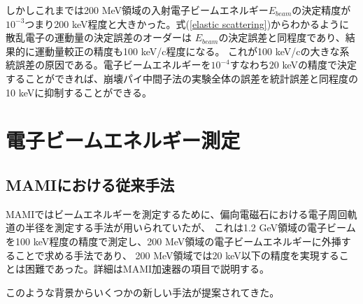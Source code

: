 \documentclass[a4paper,11pt,uplatex]{jsbook}
\begin{document}
しかしこれまでは200 MeV領域の入射電子ビームエネルギー$E_{beam}$の決定精度が$10^{-3}$つまり200 keV程度と大きかった。式(\ref{elastic scattering})からわかるように散乱電子の運動量の決定誤差のオーダーは
$E_{beam}$の決定誤差と同程度であり、結果的に運動量較正の精度も100 keV/c程度になる。
これが100 keV/cの大きな系統誤差の原因である。電子ビームエネルギーを$10^{-4}$すなわち$20$ keVの精度で決定することができれば、崩壊パイ中間子法の実験全体の誤差を統計誤差と同程度の10 keVに抑制することができる。

\section{電子ビームエネルギー測定}
\subsection{MAMIにおける従来手法}
MAMIではビームエネルギーを測定するために、偏向電磁石における電子周回軌道の半径を測定する手法が用いられていたが、
これは1.2 GeV領域の電子ビームを100 keV程度の精度で測定し、200 MeV領域の電子ビームエネルギーに外挿することで求める手法であり、
200 MeV領域では20 keV以下の精度を実現することは困難であった。詳細はMAMI加速器の項目で説明する。

このような背景からいくつかの新しい手法が提案されてきた。
\end{document}
